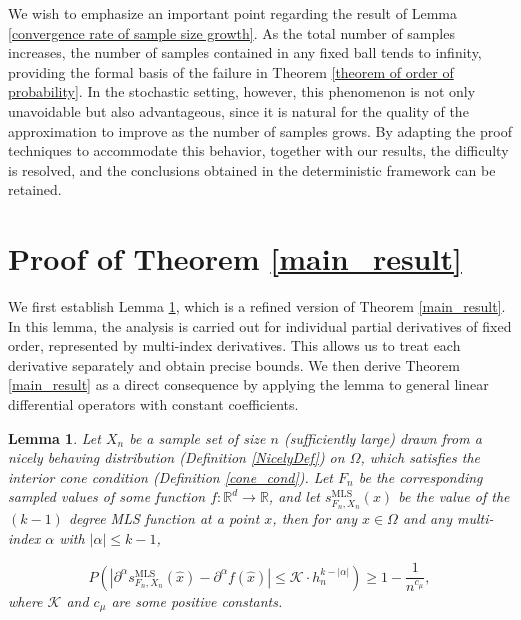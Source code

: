 \documentclass{article}
\newtheorem{lemma}{Lemma}
\newcommand{\mlsfunstoch}{s^\text{MLS}_{F_n,X_n}}
\begin{document}
We wish to emphasize an important point regarding the result of Lemma \ref{convergence rate of sample size growth}. As the total number of samples increases, the number of samples contained in any fixed ball tends to infinity, providing the formal basis of the failure in Theorem \ref{theorem of order of probability}.  
In the stochastic setting, however, this phenomenon is not only unavoidable but also advantageous, since it is natural for the quality of the approximation to improve as the number of samples grows. By adapting the proof techniques to accommodate this behavior, together with our results, the difficulty is resolved, and the conclusions obtained in the deterministic framework can be retained.

\section{Proof of Theorem \ref{main_result}} \label{Main_Result_proof}
We first establish Lemma \ref{main_result_assisting}, which is a refined version of Theorem \ref{main_result}. In this lemma, the analysis is carried out for individual partial derivatives of fixed order, represented by multi-index derivatives. This allows us to treat each derivative separately and obtain precise bounds. We then derive Theorem \ref{main_result} as a direct consequence by applying the lemma to general linear differential operators with constant coefficients.

\begin{lemma}
    Let $X_n$ be a sample set of size $n$ (sufficiently large) drawn from a nicely behaving distribution \emph{(}Definition \ref{NicelyDef}\emph{)} on $\Omega$, which satisfies the interior cone condition \emph{(}Definition \ref{cone_cond}\emph{)}. 
    Let $F_n$ be the corresponding sampled values of some function $f:\mathbb{R}^d\rightarrow\mathbb{R}$, and let $\mlsfunstoch(x)$ be the value of the $(k-1)$ degree MLS function at a point $x$, then for any $\hat{x}\in \Omega$ and any multi-index $\alpha$ with  $|\alpha|\leq k-1$,

    \begin{equation}
        P\left(\left|\partial^{\alpha} \mlsfunstoch(\hat{x})-\partial^{\alpha} f(\hat{x})\right| \leq\mathcal{K}\cdot h_n^{k-|\alpha|}\right)\geq 1-\frac{1}{n^{c_\mu}},
    \end{equation}
    where $\mathcal{K}$ and $c_\mu$ are some positive constants.  \label{main_result_assisting}
\end{lemma}
\end{document}
